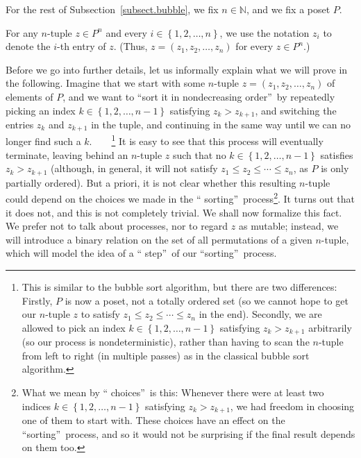 \documentclass[numbers=enddot,12pt,final,onecolumn,notitlepage]{scrartcl}%
\theoremstyle{definition}
\begin{document}
For the rest of Subsection~\ref{subsect.bubble}, we fix $n\in\mathbb{N}$, and
we fix a poset $P$.

For any $n$-tuple $z\in P^{n}$ and every $i\in\left\{  1,2,\ldots,n\right\}
$, we use the notation $z_{i}$ to denote the $i$-th entry of $z$. (Thus,
$z=\left(  z_{1},z_{2},\ldots,z_{n}\right)  $ for every $z\in P^{n}$.)

Before we go into further details, let us informally explain what we will
prove in the following. Imagine that we start with some $n$-tuple $z=\left(
z_{1},z_{2},\ldots,z_{n}\right)  $ of elements of $P$, and we want to
\textquotedblleft sort it in nondecreasing order\textquotedblright\ by
repeatedly picking an index $k\in\left\{  1,2,\ldots,n-1\right\}  $ satisfying
$z_{k}>z_{k+1}$, and switching the entries $z_{k}$ and $z_{k+1}$ in the tuple,
and continuing in the same way until we can no longer find such a
$k$.\ \ \ \ \footnote{This is similar to the bubble sort algorithm, but there
are two differences: Firstly, $P$ is now a poset, not a totally ordered set
(so we cannot hope to get our $n$-tuple $z$ to satisfy $z_{1}\leq z_{2}%
\leq\cdots\leq z_{n}$ in the end). Secondly, we are allowed to pick an index
$k\in\left\{  1,2,\ldots,n-1\right\}  $ satisfying $z_{k}>z_{k+1}$ arbitrarily
(so our process is nondeterministic), rather than having to scan the $n$-tuple
from left to right (in multiple passes) as in the classical bubble sort
algorithm.} It is easy to see that this process will eventually terminate,
leaving behind an $n$-tuple $z$ such that no $k\in\left\{  1,2,\ldots
,n-1\right\}  $ satisfies $z_{k}>z_{k+1}$ (although, in general, it will not
satisfy $z_{1}\leq z_{2}\leq\cdots\leq z_{n}$, as $P$ is only partially
ordered). But a priori, it is not clear whether this resulting $n$-tuple could
depend on the choices we made in the \textquotedblleft
sorting\textquotedblright\ process\footnote{What we mean by \textquotedblleft
choices\textquotedblright\ is this: Whenever there were at least two indices
$k\in\left\{  1,2,\ldots,n-1\right\}  $ satisfying $z_{k}>z_{k+1}$, we had
freedom in choosing one of them to start with. These choices have an effect on
the \textquotedblleft sorting\textquotedblright\ process, and so it would not
be surprising if the final result depends on them too.}. It turns out that it
does not, and this is not completely trivial. We shall now formalize this
fact. We prefer not to talk about processes, nor to regard $z$ as mutable;
instead, we will introduce a binary relation on the set of all permutations of
a given $n$-tuple, which will model the idea of a \textquotedblleft
step\textquotedblright\ of our \textquotedblleft sorting\textquotedblright\ process.
\end{document}
